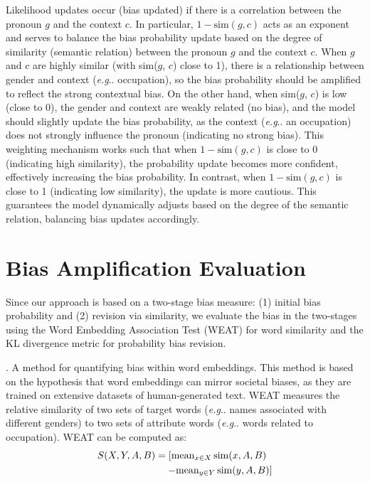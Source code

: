 \documentclass[11pt]{article}
\makeatletter
\newcommand{\R}[1]{{\color{black} {#1}}}
\def\eg{\emph{e.g}\onedot} \def\Eg{\emph{E.g}\onedot}
\DeclareRobustCommand\eg{%
  \UKUS@comma{e.g}%
}
\DeclareRobustCommand\onedot{\futurelet\@let@token\@onedot}
\def\@onedot{\ifx\@let@token.\else.\null\fi\xspace}
\DeclareRobustCommand\onedot{\futurelet\@let@token\@onedot}
\def\@onedot{\ifx\@let@token.\else.\null\fi\xspace}
\DeclareRobustCommand\onedot{\futurelet\@let@token\@onedot}
\def\@onedot{\ifx\@let@token.\else.\null\fi\xspace}
\def\eg{\emph{e.g}\onedot} \def\Eg{\emph{E.g}\onedot}
\makeatother
\begin{document}
 Likelihood updates occur (bias updated) if there is a correlation between the pronoun $g$ \R{and the context $c$.  In particular, $1-\text{sim}(g, c)$ acts as an exponent and serves to balance the bias probability update based on the degree of similarity (semantic relation) between the pronoun $g$ and the context $c$. When $g$ and $c$ are highly similar (with sim($g$, $c$) close to 1), there is a relationship between gender and context (\eg occupation), so the bias probability should be amplified to reflect the strong contextual bias. On the other hand, when sim($g$, $c$) is low (close to 0), the gender and context are weakly related (no bias), and the model should slightly update the bias probability, as the context (\eg an occupation) does not strongly influence the pronoun (indicating no strong bias). This weighting mechanism works such that when $1-\text{sim}(g, c)$  is close to 0 (indicating high similarity), the probability update becomes more confident, effectively increasing the bias probability. In contrast, when $1-\text{sim}(g, c)$  is close to 1 (indicating low similarity), the update is more cautious. This guarantees the model dynamically adjusts based on the degree of the semantic relation, balancing bias updates accordingly.}


\section{Bias Amplification Evaluation}


\R{Since our approach is based on a two-stage bias measure: (1) initial bias probability and (2) revision via similarity, we evaluate the bias in the two-stages using the Word Embedding Association Test (WEAT) for word similarity and the KL divergence metric for probability bias revision.}


. A method for quantifying bias within word embeddings. This method is based on the hypothesis that word embeddings can mirror societal biases, as they are trained on extensive datasets of human-generated text. WEAT measures the relative similarity of two sets of target words (\eg names associated with different genders) to two sets of attribute words (\eg words related to occupation). WEAT can be computed as:
\begin{align*}
\small
S(X, Y, A, B) &= \left[ \text{mean}_{x \in X} \operatorname{sim}(x, A, B) \right. \\
&\quad \left. - \text{mean}_{y \in Y} \operatorname{sim}(y, A, B) \right]
\end{align*}
\end{document}
